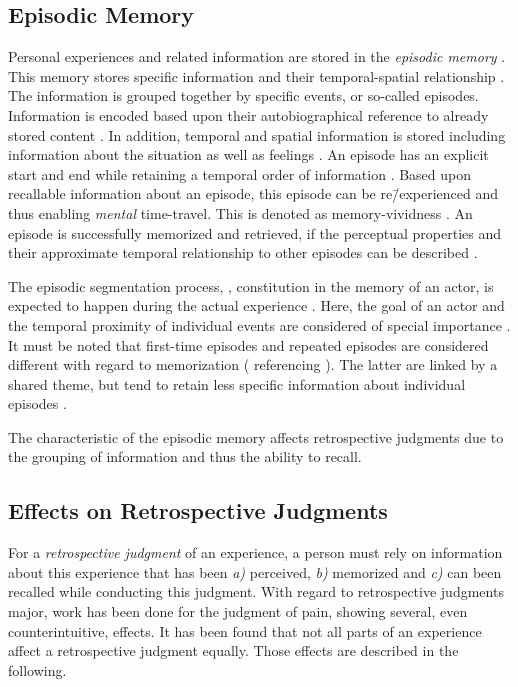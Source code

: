 \subsection{Episodic Memory}
Personal experiences and related information are stored in the \emph{episodic memory} \citep{tulving_episodic_1972}.
This memory stores specific information and their temporal-spatial relationship \citep[][p.\,385]{tulving_episodic_1972}.
The information is grouped together by specific events, or so-called episodes.
Information is encoded based upon their autobiographical reference to already stored content \citep[][p.\,385f.]{tulving_episodic_1972}.
In addition, temporal and spatial information is stored including information about the situation as well as feelings \citep[][p.\,385f.]{tulving_episodic_1972}.
An episode has an explicit start and end while retaining a temporal order of information \citep[][p.\,262]{conway_construction_2000}.
Based upon recallable information about an episode, this episode can be re\=/experienced and thus enabling \emph{mental} time-travel.
This is denoted as memory-vividness \citep{conway_construction_2000}.
An episode is successfully memorized and retrieved, if the perceptual properties and their approximate temporal relationship to other episodes can be described \citep{conway_construction_2000}.

The episodic segmentation process, \ie, constitution in the memory of an actor, is expected to happen during the actual experience \citep[][]{ezzyat_what_2011, kurby_segmentation_2008}.
Here, the goal of an actor and the temporal proximity of individual events are considered of special importance \citep[][]{black_episodes_1979}.
It must be noted that first-time episodes and repeated episodes are considered different with regard to memorization (\citet{conway_construction_2000} referencing \citet{barsalou_content_1988}).
The latter are linked by a shared theme, but tend to retain less specific information about individual episodes \citep{robinson_first_1992}.

The characteristic of the episodic memory affects retrospective judgments due to the grouping of information and thus the ability to recall.

\subsection{Effects on Retrospective Judgments}\label{chap03:effects}
For a \emph{retrospective judgment} of an experience, a person must rely on information about this experience that has been \emph{a)} perceived, \emph{b)} memorized and \emph{c)} can been recalled while conducting this judgment.
With regard to retrospective judgments major, work has been done for the judgment of pain, showing several, even counterintuitive, effects.
It has been found that not all parts of an experience affect a retrospective judgment equally.
Those effects are described in the following.

